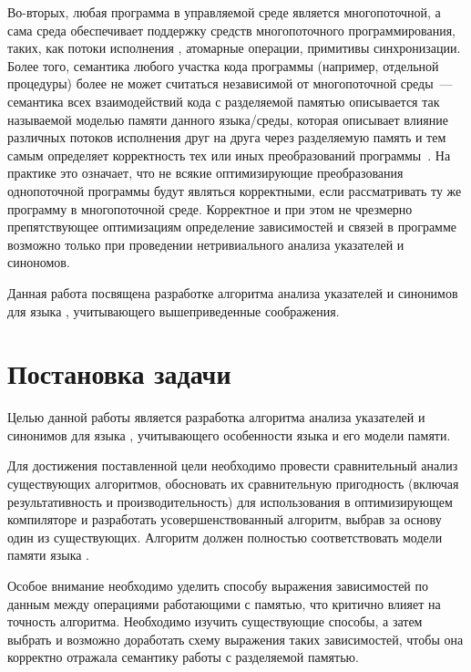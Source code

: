 \documentclass[14pt,titlepage,draft]{extarticle}
\newcommand{\java}{\eng{Java}\xspace}
\begin{document}
    Во-вторых, любая программа в управляемой среде является многопоточной, а
    сама среда обеспечивает поддержку средств многопоточного программирования,
    таких, как потоки исполнения , атомарные операции,
    примитивы синхронизации. Более того, семантика любого участка кода
    программы (например, отдельной процедуры) более не может считаться
    независимой от многопоточной среды~--- семантика всех взаимодействий кода с
    разделяемой памятью описывается так называемой моделью памяти данного
    языка/среды, которая описывает влияние различных потоков исполнения друг на
    друга через разделяемую память и тем самым определяет корректность тех или
    иных преобразований программы~\cite{manson_jmm}. На практике это означает,
    что не всякие оптимизирующие преобразования однопоточной программы будут
    являться корректными, если рассматривать ту же программу в многопоточной
    среде. Корректное и при этом не чрезмерно препятствующее оптимизациям
    определение зависимостей и связей в программе возможно только при
    проведении нетривиального анализа указателей и синономов.

    Данная работа посвящена разработке алгоритма анализа указателей и синонимов
    для языка \java, учитывающего вышеприведенные соображения.

  \section{Постановка задачи}

    Целью данной работы является разработка алгоритма анализа указателей и
    синонимов для языка \java, учитывающего особенности языка и его модели
    памяти.

    Для достижения поставленной цели необходимо провести сравнительный анализ
    существующих алгоритмов, обосновать их сравнительную пригодность (включая
    результативность и производительность) для использования в оптимизирующем
    компиляторе и разработать усовершенствованный алгоритм, выбрав за основу
    один из существующих. Алгоритм должен полностью соответствовать модели
    памяти языка \java.

    Особое внимание необходимо уделить способу выражения зависимостей по
    данным между операциями работающими с памятью, что критично влияет на
    точность алгоритма. Необходимо изучить существующие способы, а затем
    выбрать и возможно доработать схему выражения таких зависимостей, чтобы она
    корректно отражала семантику работы с разделяемой памятью.
\end{document}
